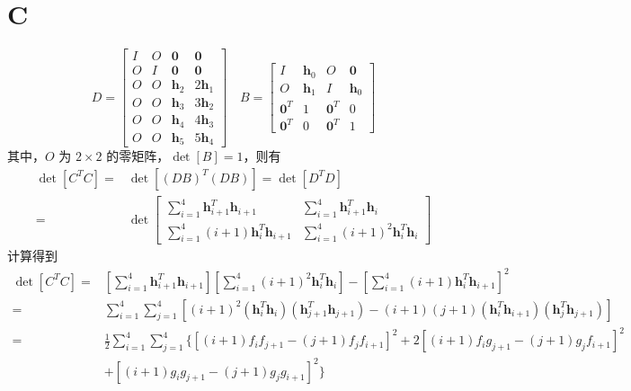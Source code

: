 \setcounter{section}{2}
\section*{C}
\begin{equation}
	D = \left[\begin{array}{c|c|c|c}
		I & O & \bm{0} & \bm{0} \\ \hline
		O & I & \bm{0} & \bm{0} \\ \hline
		O & O & \bm{h}_2 & 2\bm{h}_1 \\ \hline
		O & O & \bm{h}_3 & 3\bm{h}_2 \\ \hline
		O & O & \bm{h}_4 & 4\bm{h}_3 \\ \hline
		O & O & \bm{h}_5 & 5\bm{h}_4
	\end{array}\right] \quad B = \left[\begin{array}{c|c|c|c}
		I & \bm{h}_0 & O & \bm{0} \\ \hline
		O & \bm{h}_1 & I & \bm{h}_0 \\ \hline
		\bm{0}^T & 1 & \bm{0}^T & 0 \\ \hline
		\bm{0}^T & 0 & \bm{0}^T & 1
\end{array} \right]
\end{equation}
其中，$O$ 为 $2\times 2$ 的零矩阵，$\det[B]=1$，则有
\begin{equation}
	\begin{split}
			\det[C^T C] =& \det[(DB)^T (DB)]=\det[D^T D] \\
			=&\det \left[\begin{array}{cc}
			\sum_{i=1}^{4} \bm{h}_{i+1}^T \bm{h}_{i+1} & \sum_{i=1}^{4} \bm{h}_{i+1}^T \bm{h}_i \\
			\sum_{i=1}^{4}(i+1)\bm{h}_i^T\bm{h}_{i+1} & \sum_{i=1}^{4}(i+1)^2 \bm{h}_i^T \bm{h}_i
		\end{array}\right]
	\end{split}
\end{equation}
计算得到
\begin{equation}
	\begin{split}
		\det[C^T C] =&\left[\sum_{i=1}^{4}\bm{h}_{i+1}^T\bm{h}_{i+1} \right] \left[\sum_{i=1}^{4}(i+1)^2 \bm{h}_{i}^T\bm{h}_i \right] - \left[ \sum_{i=1}^{4} (i+1) \bm{h}_i^T \bm{h}_{i+1} \right]^2 \\
		=& \sum_{i=1}^{4} \sum_{j=1}^{4} [(i+1)^2 (\bm{h}_{i}^T \bm{h}_i)(\bm{h}_{j+1}^T \bm{h}_{j+1}) - (i+1)(j+1)(\bm{h}_i^T \bm{h}_{i+1}) (\bm{h}_j^T \bm{h}_{j+1})] \\
		=&\frac{1}{2}\sum_{i=1}^{4} \sum_{j=1}^{4}\lbrace [(i+1)f_i f_{j+1} - (j+1)f_j f_{i+1}]^2 + 2[(i+1)f_i g_{j+1} - (j+1) g_j f_{i+1}]^2 \\
		&+ [(i+1)g_i g_{j+1} - (j+1) g_j g_{i+1}]^2 \rbrace
	\end{split}
\end{equation}
